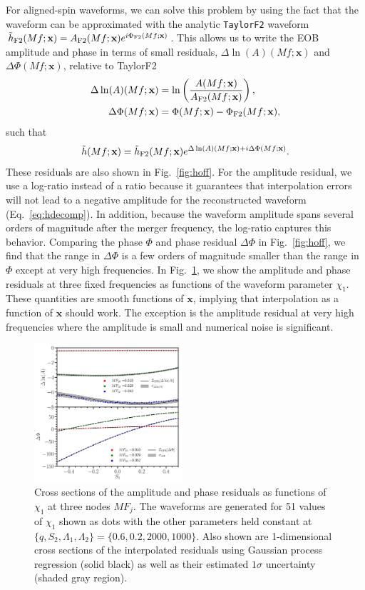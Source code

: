 \documentclass[prd,aps,letter,twocolumn,floatfix,notitlepage,nofootinbib]{revtex4-1}
\def\bx{\mathbf{x}}
\begin{document}
For aligned-spin waveforms, we can solve this problem by using the fact that the waveform can be approximated with the analytic \texttt{TaylorF2} waveform $\tilde h_{\rm F2}(Mf; \bx) = A_{\rm F2}(Mf; \bx) e^{i\Phi_{\rm F2} (Mf; \bx)}$. This allows us to write the EOB amplitude and phase in terms of small residuals, $\Delta\ln(A)(Mf; \bx)$ and $\Delta\Phi(Mf; \bx)$, relative to TaylorF2
\begin{align}
\Delta\ln(A)(Mf; \bx) &= \ln\left(\frac{ A(Mf; \bx) }{ A_{\rm F2}(Mf; \bx)}\right), \label{eq:ampres}\\
\Delta\Phi(Mf; \bx) & = \Phi(Mf; \bx) - \Phi_{\rm F2}(Mf; \bx), \label{eq:phaseres}
\end{align}
such that
\begin{align}
\tilde h(Mf; \bx) = \tilde h_{\rm F2}(Mf; \bx) e^{\Delta\ln(A)(Mf; \bx) + i  \Delta\Phi(Mf; \bx)}.
\label{eq:hdecomp}
\end{align}
These residuals are also shown in Fig.~\ref{fig:hoff}. For the amplitude residual, we use a log-ratio instead of a ratio because it guarantees that interpolation errors will not lead to a negative amplitude for the reconstructed waveform (Eq.~\eqref{eq:hdecomp}). In addition, because the waveform amplitude spans several orders of magnitude after the merger frequency, the log-ratio captures this behavior. Comparing the phase $\Phi$ and phase residual $\Delta\Phi$ in Fig.~\ref{fig:hoff}, we find that the range in $\Delta\Phi$ is a few orders of magnitude smaller than the range in $\Phi$ except at very high frequencies. In Fig.~\ref{fig:dhofs}, we show the amplitude and phase residuals at three fixed frequencies as functions of the waveform parameter $\chi_1$. These quantities are smooth functions of $\bx$, implying that interpolation as a function of $\bx$ should work. The exception is the amplitude residual at very high frequencies where the amplitude is small and numerical noise is significant.

\begin{figure}[htb]
\centering
\includegraphics[width=0.49\textwidth]{dhofs.pdf}
\caption{Cross sections of the amplitude and phase residuals as functions of $\chi_1$ at three nodes $MF_j$. The waveforms are generated for 51 values of $\chi_1$ shown as dots with the other parameters held constant at $\{q, S_2, \Lambda_1, \Lambda_2\} = \{0.6, 0.2, 2000, 1000\}$. Also shown are 1-dimensional cross sections of the interpolated residuals using Gaussian process regression (solid black) as well as their estimated $1\sigma$ uncertainty (shaded gray region).}
\label{fig:dhofs}
\end{figure}
\end{document}
